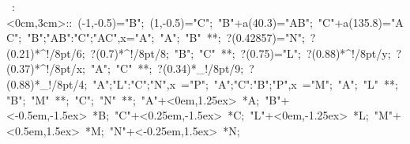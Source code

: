 
%

\hbox{
\xy    <3cm,0cm>:<0cm,3cm>::
       (-1,-0.5)="B"; (1,-0.5)="C"; 
       "B"+a(40.3)="AB"; "C"+a(135.8)="AC"; {"B";"AB":"C";"AC",x}="A"; 
       "A"; "B" **\dir{-}; ?(0.42857)="N";  ?(0.21)*^!/8pt/{6}; ?(0.7)*^!/8pt/{8}; 
       "B"; "C" **\dir{-}; ?(0.75)="L"; ?(0.88)*^!/8pt/{y}; ?(0.37)*^!/8pt/{x};
       "A"; "C" **\dir{-};  ?(0.34)*_!/8pt/{9}; ?(0.88)*_!/8pt/{4};
       {"A";"L":"C";"N",x} ="P";   {"A";"C":"B";"P",x} ="M";
%
       "A"; "L" **\dir{-};
       "B"; "M" **\dir{-};
       "C"; "N" **\dir{-};
%
%
       "A"+<0em,1.25ex> *{A}; 
       "B"+<-0.5em,-1.5ex> *{B}; 
       "C"+<0.25em,-1.5ex> *{C}; 
%
       "L"+<0em,-1.25ex> *{L}; 
       "M"+<0.5em,1.5ex> *{M}; 
       "N"+<-0.25em,1.5ex> *{N}; 
%
\endxy}




